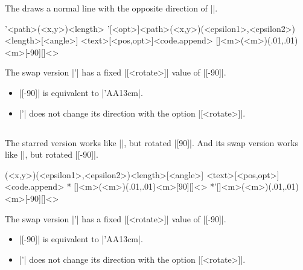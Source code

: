 The   draws a normal line with the opposite direction of |\tznormal|.

\begin{tzdef}
\tznormal'{<path>}(<x,y>){<length>}
\tznormal'[<opt>]{<path>}(<x,y>)(<epsilon1>,<epsilon2>){<length>}[<angle>]
        {<text>}[<pos,opt>]<code.append>
  []{<m>}(<m>)(.01,.01){<m>}[-90]{}[]<>
\end{tzdef}

\remark
The swap version |\tznormal'| has a fixed |[<rotate>]| value of |[-90]|.
\begin{itemize}
\item |[-90]| is equivalent to |\tznormal'{AA}{1}{3cm}|.
\item |\tznomral'| does not change its direction with the option |[<rotate>]|.
\end{itemize}

\begin{tzcode}{.3}
\end{tzcode}


\subsection{\protect{}}
\label{ss:tznormal*}

The starred version \icmd{\tznormal*} works like |\tzslope|, but rotated |[90]|.
And its swap version  works like |\tzslope|, but rotated |[-90]|.

\begin{tzdef}
(<x,y>)(<epsilon1>,<epsilon2>){<length>}[<angle>]
        {<text>}[<pos,opt>]<code.append>
* []{<m>}(<m>)(.01,.01){<m>}[90]{}[]<>
*'[]{<m>}(<m>)(.01,.01){<m>}[-90]{}[]<>
\end{tzdef}


\remark
The swap version |\tznormal*'| has a fixed |[<rotate>]| value of |[-90]|.
\begin{itemize}
\item |[-90]| is equivalent to |\tznormal*'{AA}{1}{3cm}|.
\item |\tznomral*'| does not change its direction with the option |[<rotate>]|.
\end{itemize}


